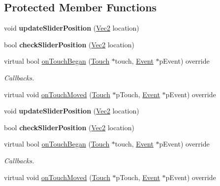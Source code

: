 \subsection*{Protected Member Functions}
\begin{DoxyCompactItemize}
\item 
\mbox{\label{classControlSaturationBrightnessPicker_a7aa570099b578f4d446d48145ba0c12a}} 
void {\bfseries update\+Slider\+Position} (\hyperlink{classVec2}{Vec2} location)
\item 
\mbox{\label{classControlSaturationBrightnessPicker_ad2bbfa433da60036b6643ad0d4b26b38}} 
bool {\bfseries check\+Slider\+Position} (\hyperlink{classVec2}{Vec2} location)
\item 
virtual bool \hyperlink{classControlSaturationBrightnessPicker_a4de153e53cccd78b56d9dc3e18411777}{on\+Touch\+Began} (\hyperlink{classTouch}{Touch} $\ast$touch, \hyperlink{classEvent}{Event} $\ast$p\+Event) override
\begin{DoxyCompactList}\small\item\em Callbacks. \end{DoxyCompactList}\item 
virtual void \hyperlink{classControlSaturationBrightnessPicker_aea0bada57d1f6e2bb3f456e77e342979}{on\+Touch\+Moved} (\hyperlink{classTouch}{Touch} $\ast$p\+Touch, \hyperlink{classEvent}{Event} $\ast$p\+Event) override
\item 
\mbox{\label{classControlSaturationBrightnessPicker_a7aa570099b578f4d446d48145ba0c12a}} 
void {\bfseries update\+Slider\+Position} (\hyperlink{classVec2}{Vec2} location)
\item 
\mbox{\label{classControlSaturationBrightnessPicker_ad2bbfa433da60036b6643ad0d4b26b38}} 
bool {\bfseries check\+Slider\+Position} (\hyperlink{classVec2}{Vec2} location)
\item 
virtual bool \hyperlink{classControlSaturationBrightnessPicker_a8660ed765c6c5c0d8856f59aa0ba34b2}{on\+Touch\+Began} (\hyperlink{classTouch}{Touch} $\ast$touch, \hyperlink{classEvent}{Event} $\ast$p\+Event) override
\begin{DoxyCompactList}\small\item\em Callbacks. \end{DoxyCompactList}\item 
virtual void \hyperlink{classControlSaturationBrightnessPicker_a1330b4d2fca4a1a312b1594e6ee6b99c}{on\+Touch\+Moved} (\hyperlink{classTouch}{Touch} $\ast$p\+Touch, \hyperlink{classEvent}{Event} $\ast$p\+Event) override
\end{DoxyCompactItemize}
